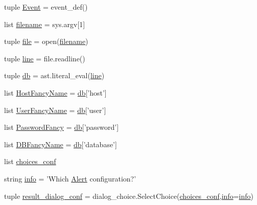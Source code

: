 \begin{DoxyCompactItemize}
\item 
tuple \hyperlink{namespacerun__archival_a81b9709cc3c8589bfc7ecd72c354cba6}{Event} = event\-\_\-def()
\item 
list \hyperlink{namespacerun__archival_ad69d736434dc745a1e6b5ba5890edf45}{filename} = sys.\-argv\mbox{[}1\mbox{]}
\item 
tuple \hyperlink{namespacerun__archival_a7dfbcbcaa557fe14b2d806be5becb9c8}{file} = open(\hyperlink{namespacerun__archival_ad69d736434dc745a1e6b5ba5890edf45}{filename})
\item 
tuple \hyperlink{namespacerun__archival_ab8d2168a41c4abe996b487a690446cea}{line} = file.\-readline()
\item 
tuple \hyperlink{namespacerun__archival_a76dda95c4c4434f57e40766fc2aff53c}{db} = ast.\-literal\-\_\-eval(\hyperlink{namespacerun__archival_ab8d2168a41c4abe996b487a690446cea}{line})
\item 
list \hyperlink{namespacerun__archival_ab5fa54210432cb72d27084b733c3cdc0}{Host\-Fancy\-Name} = \hyperlink{namespacerun__archival_a76dda95c4c4434f57e40766fc2aff53c}{db}\mbox{[}'host'\mbox{]}
\item 
list \hyperlink{namespacerun__archival_ad3d0610b847435ac05cfa998baad6da1}{User\-Fancy\-Name} = \hyperlink{namespacerun__archival_a76dda95c4c4434f57e40766fc2aff53c}{db}\mbox{[}'user'\mbox{]}
\item 
list \hyperlink{namespacerun__archival_adbfa915ad2708566274573eae9d849ad}{Password\-Fancy} = \hyperlink{namespacerun__archival_a76dda95c4c4434f57e40766fc2aff53c}{db}\mbox{[}'password'\mbox{]}
\item 
list \hyperlink{namespacerun__archival_a4b6a8f18621f35aec3e99d318bca2898}{D\-B\-Fancy\-Name} = \hyperlink{namespacerun__archival_a76dda95c4c4434f57e40766fc2aff53c}{db}\mbox{[}'database'\mbox{]}
\item 
list \hyperlink{namespacerun__archival_aa8dcfb9c105b84ffc8ceb3c2cb4e6e4a}{choices\-\_\-conf}
\item 
string \hyperlink{namespacerun__archival_a8ab6dc99642b199ed41dfc7ac9c88a92}{info} = 'Which \hyperlink{classamonpy_1_1dbase_1_1db__classes_1_1_alert}{Alert} configuration?'
\item 
tuple \hyperlink{namespacerun__archival_a95ebfc7a9f4c5fdcac7e606bd1c8b6af}{result\-\_\-dialog\-\_\-conf} = dialog\-\_\-choice.\-Select\-Choice(\hyperlink{namespacerun__archival_aa8dcfb9c105b84ffc8ceb3c2cb4e6e4a}{choices\-\_\-conf},\hyperlink{namespacerun__archival_a8ab6dc99642b199ed41dfc7ac9c88a92}{info}=\hyperlink{namespacerun__archival_a8ab6dc99642b199ed41dfc7ac9c88a92}{info})

\end{DoxyCompactItemize}
